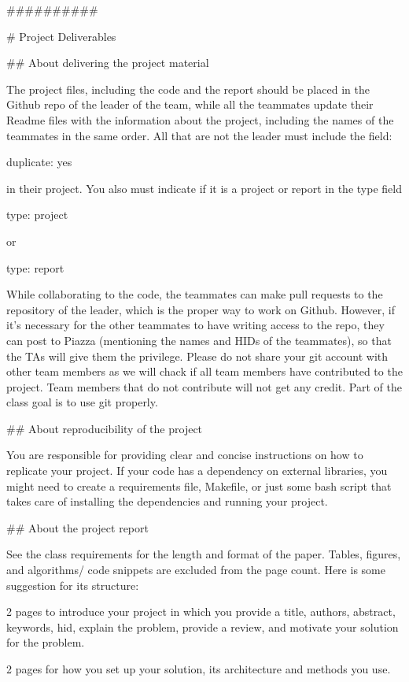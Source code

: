 
##########

# Project Deliverables

## About delivering the project material

The project files, including the code and the report should be placed
in the Github repo of the leader of the team, while all the teammates
update their Readme files with the information about the project,
including the names of the teammates in the same order. All that are
not the leader must include the field: 

duplicate: yes 

in their project. You also must indicate if it is a project or report
in the type field

type: project

or

type: report 


While collaborating to the code,
the teammates can make pull requests to the repository of the leader,
which is the proper way to work on Github. However, if it’s necessary
for the other teammates to have writing access to the repo, they can
post to Piazza (mentioning the names and HIDs of the teammates), so
that the TAs will give them the privilege. Please do not share your
git account with other team members as we will chack if all team
members have contributed to the project. Team members that do not
contribute will not get any credit. Part of the class goal is to use
git properly.


## About reproducibility of the project

You are responsible for
providing clear and concise instructions on how to replicate your
project. If your code has a dependency on external libraries, you
might need to create a requirements file, Makefile, or just some bash
script that takes care of installing the dependencies and running your
project.

## About the project report

See the class requirements for the length and format of the
paper. Tables, figures, and algorithms/ code snippets are excluded
from the page count. Here is some suggestion for its structure:

2 pages to introduce your project in which you provide a title,
authors, abstract, keywords, hid, explain the problem, provide a
review, and motivate your solution for the problem.

2 pages for how you set up your solution, its architecture and
methods you use.

